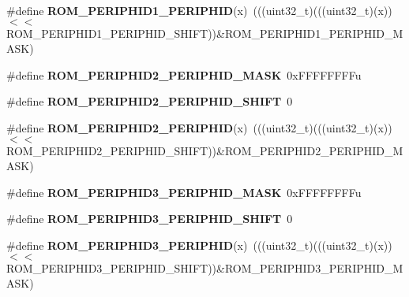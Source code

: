 \begin{DoxyCompactItemize}
\#define {\bfseries R\+O\+M\+\_\+\+P\+E\+R\+I\+P\+H\+I\+D1\+\_\+\+P\+E\+R\+I\+P\+H\+ID}(x)~(((uint32\+\_\+t)(((uint32\+\_\+t)(x))$<$$<$R\+O\+M\+\_\+\+P\+E\+R\+I\+P\+H\+I\+D1\+\_\+\+P\+E\+R\+I\+P\+H\+I\+D\+\_\+\+S\+H\+I\+FT))\&R\+O\+M\+\_\+\+P\+E\+R\+I\+P\+H\+I\+D1\+\_\+\+P\+E\+R\+I\+P\+H\+I\+D\+\_\+\+M\+A\+SK)
\item 
\mbox{\label{group___r_o_m___register___masks_gac4fd9dca16b12b524b3f7be8cb5d0386}} 
\#define {\bfseries R\+O\+M\+\_\+\+P\+E\+R\+I\+P\+H\+I\+D2\+\_\+\+P\+E\+R\+I\+P\+H\+I\+D\+\_\+\+M\+A\+SK}~0x\+F\+F\+F\+F\+F\+F\+F\+Fu
\item 
\mbox{\label{group___r_o_m___register___masks_ga3a0032b94f8d01378b20d260317d85d9}} 
\#define {\bfseries R\+O\+M\+\_\+\+P\+E\+R\+I\+P\+H\+I\+D2\+\_\+\+P\+E\+R\+I\+P\+H\+I\+D\+\_\+\+S\+H\+I\+FT}~0
\item 
\mbox{\label{group___r_o_m___register___masks_gac890c8c525b06c4792a9bc16569978e1}} 
\#define {\bfseries R\+O\+M\+\_\+\+P\+E\+R\+I\+P\+H\+I\+D2\+\_\+\+P\+E\+R\+I\+P\+H\+ID}(x)~(((uint32\+\_\+t)(((uint32\+\_\+t)(x))$<$$<$R\+O\+M\+\_\+\+P\+E\+R\+I\+P\+H\+I\+D2\+\_\+\+P\+E\+R\+I\+P\+H\+I\+D\+\_\+\+S\+H\+I\+FT))\&R\+O\+M\+\_\+\+P\+E\+R\+I\+P\+H\+I\+D2\+\_\+\+P\+E\+R\+I\+P\+H\+I\+D\+\_\+\+M\+A\+SK)
\item 
\mbox{\label{group___r_o_m___register___masks_ga0f7212db2daf16bb9cd76004eef1f845}} 
\#define {\bfseries R\+O\+M\+\_\+\+P\+E\+R\+I\+P\+H\+I\+D3\+\_\+\+P\+E\+R\+I\+P\+H\+I\+D\+\_\+\+M\+A\+SK}~0x\+F\+F\+F\+F\+F\+F\+F\+Fu
\item 
\mbox{\label{group___r_o_m___register___masks_ga61106adc7eb36f078c312d6111da5941}} 
\#define {\bfseries R\+O\+M\+\_\+\+P\+E\+R\+I\+P\+H\+I\+D3\+\_\+\+P\+E\+R\+I\+P\+H\+I\+D\+\_\+\+S\+H\+I\+FT}~0
\item 
\mbox{\label{group___r_o_m___register___masks_gaa9d92ba0e5acb77de8834d3c921ae4e3}} 
\#define {\bfseries R\+O\+M\+\_\+\+P\+E\+R\+I\+P\+H\+I\+D3\+\_\+\+P\+E\+R\+I\+P\+H\+ID}(x)~(((uint32\+\_\+t)(((uint32\+\_\+t)(x))$<$$<$R\+O\+M\+\_\+\+P\+E\+R\+I\+P\+H\+I\+D3\+\_\+\+P\+E\+R\+I\+P\+H\+I\+D\+\_\+\+S\+H\+I\+FT))\&R\+O\+M\+\_\+\+P\+E\+R\+I\+P\+H\+I\+D3\+\_\+\+P\+E\+R\+I\+P\+H\+I\+D\+\_\+\+M\+A\+SK)
$$
\end{DoxyCompactItemize}
